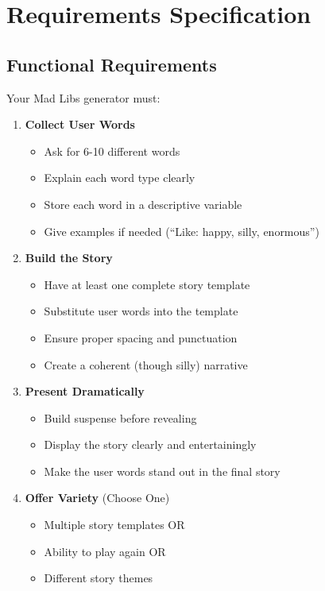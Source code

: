 \documentclass[
  letterpaper,
  DIV=11,
  numbers=noendperiod,
  oneside]{scrreprt}
\providecommand{\tightlist}{%
  \setlength{\itemsep}{0pt}\setlength{\parskip}{0pt}}\usepackage{longtable,booktabs,array}
\begin{document}
\section{Requirements Specification}\label{requirements-specification-1}

\subsection{Functional Requirements}\label{functional-requirements-1}

Your Mad Libs generator must:

\begin{enumerate}
\def\labelenumi{\arabic{enumi}.}
\tightlist
\item
  \textbf{Collect User Words}

  \begin{itemize}
  \tightlist
  \item
    Ask for 6-10 different words
  \item
    Explain each word type clearly
  \item
    Store each word in a descriptive variable
  \item
    Give examples if needed (``Like: happy, silly, enormous'')
  \end{itemize}
\item
  \textbf{Build the Story}

  \begin{itemize}
  \tightlist
  \item
    Have at least one complete story template
  \item
    Substitute user words into the template
  \item
    Ensure proper spacing and punctuation
  \item
    Create a coherent (though silly) narrative
  \end{itemize}
\item
  \textbf{Present Dramatically}

  \begin{itemize}
  \tightlist
  \item
    Build suspense before revealing
  \item
    Display the story clearly and entertainingly
  \item
    Make the user words stand out in the final story
  \end{itemize}
\item
  \textbf{Offer Variety} (Choose One)

  \begin{itemize}
  \tightlist
  \item
    Multiple story templates OR
  \item
    Ability to play again OR
  \item
    Different story themes
  \end{itemize}
\end{enumerate}
\end{document}
